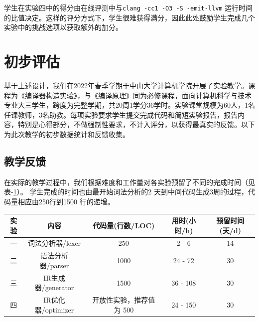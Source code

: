 \documentclass{SCIS2020cn}
\begin{document}
学生在实验四中的得分由在线评测中与\texttt{clang -cc1 -O3 -S -emit-llvm} 运行时间的比值决定。这样的评分方式下，学生很难获得满分，因此此处鼓励学生完成几个实验中的挑战选项以获取额外的加分。

\section{初步评估}
基于上述设计，我们在2022年春季学期于中山大学计算机学院开展了实验教学。课程为《编译器构造实验》，与《编译原理》同为必修课程，面向计算机科学与技术专业大三学生，跨度为完整学期，共20周1学分36学时。实验课堂规模为60人，1名任课教师，3名助教。每项实验要求学生提交完成代码和简短实验报告，报告内容，特别是心得部分，不做强制性要求，不计入评分，以获得最真实的反馈。以下为此次教学的初步数据统计和反馈收集。

\subsection{教学反馈}
在实际的教学过程中，我们根据难度和工作量对各实验预留了不同的完成时间（见表-\ref{projs}）。
学生完成的时间也由最开始词法分析的2 天到中间代码生成3周的过程，代码量相应由250行到1500 行的递增。

\begin{table}
    \centering
    \label{projs}
    \footnotesize
    \tabcolsep 19pt %
    \begin{tabular*}{1.0\textwidth}{ccccc}
        \toprule
        实验 & 内容 & 代码量(行数/LOC) & 用时(小时/h) & 预留时间(天/d) \\\hline
        一 & 词法分析器/lexer & 250 & 2 - 6 & 14\\
        二 & 语法分析器/parser & 1000 & 24 - 72 & 30\\
        三 & IR生成器/generator & 1500 & 36 - 108 & 30\\
        四 & IR优化器/optimizer & 开放性实验，推荐值为 500 & 24 - 150 & 30\\
        \bottomrule
    \end{tabular*}
\end{table}

\end{document}
